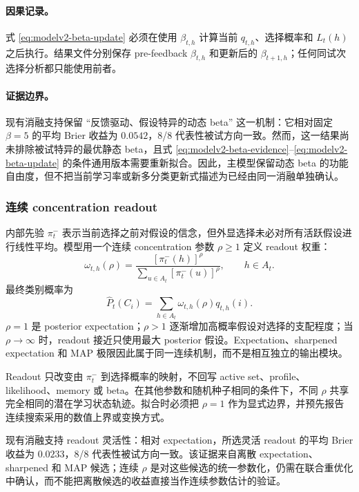 \paragraph{因果记录。}
式 \ref{eq:modelv2-beta-update} 必须在使用 $\beta_{t,h}$ 计算当前 $q_{t,h}$、选择概率和 $L_t(h)$ 之后执行。结果文件分别保存 pre-feedback $\beta_{t,h}$ 和更新后的 $\beta_{t+1,h}$；任何同试次选择分析都只能使用前者。

\paragraph{证据边界。}
现有消融支持保留 ``反馈驱动、假设特异的动态 beta'' 这一机制：它相对固定 $\beta=5$ 的平均 Brier 收益为 $0.0542$，8/8 代表性被试方向一致。然而，这一结果尚未排除被试特异的最优静态 beta，且式 \ref{eq:modelv2-beta-evidence}--\ref{eq:modelv2-beta-update} 的条件通用版本需要重新拟合。因此，主模型保留动态 beta 的功能自由度，但不把当前学习率或新多分类更新式描述为已经由同一消融单独确认。


\subsubsection{连续 concentration readout}

内部先验 $\pi_t^-$ 表示当前选择之前对假设的信念，但外显选择未必对所有活跃假设进行线性平均。模型用一个连续 concentration 参数 $\rho\geq1$ 定义 readout 权重：
\begin{equation}
    \omega_{t,h}(\rho)
    =
    \frac{
        [\pi_t^-(h)]^\rho
    }{
        \sum_{u\in A_t}[\pi_t^-(u)]^\rho
    },
    \qquad h\in A_t .
    \label{eq:modelv2-readout-weight}
\end{equation}
最终类别概率为
\begin{equation}
    \widehat P_t(C_i)
    =
    \sum_{h\in A_t}
    \omega_{t,h}(\rho)q_{t,h}(i).
    \label{eq:modelv2-choice-probability}
\end{equation}
$\rho=1$ 是 posterior expectation；$\rho>1$ 逐渐增加高概率假设对选择的支配程度；当 $\rho\rightarrow\infty$ 时，readout 接近只使用最大 posterior 假设。Expectation、sharpened expectation 和 MAP 极限因此属于同一连续机制，而不是相互独立的输出模块。

Readout 只改变由 $\pi_t^-$ 到选择概率的映射，不回写 active set、profile、likelihood、memory 或 beta。在其他参数和随机种子相同的条件下，不同 $\rho$ 共享完全相同的潜在学习状态轨迹。拟合时必须把 $\rho=1$ 作为显式边界，并预先报告连续搜索采用的数值上界或变换方式。

现有消融支持 readout 灵活性：相对 expectation，所选灵活 readout 的平均 Brier 收益为 $0.0233$，8/8 代表性被试方向一致。该证据来自离散 expectation、sharpened 和 MAP 候选；连续 $\rho$ 是对这些候选的统一参数化，仍需在联合重优化中确认，而不能把离散候选的收益直接当作连续参数估计的验证。


